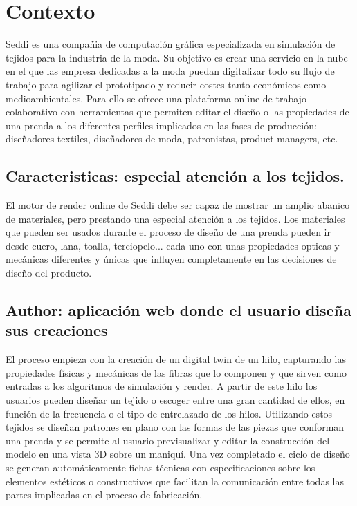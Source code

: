 \chapter{Contexto}
    Seddi es una compañia de computación gr\'afica especializada en simulaci\'on de tejidos para la
    industria de la moda.
    Su objetivo es crear una servicio en la nube en el que las empresa dedicadas a la moda puedan
    digitalizar todo su flujo de trabajo para agilizar el prototipado y reducir costes tanto econ\'omicos
    como medioambientales. Para ello se ofrece una plataforma online de trabajo colaborativo con
    herramientas que permiten editar el dise\~no o las propiedades de una prenda a los diferentes
    perfiles implicados en las fases de producci\'on: diseñadores textiles, diseñadores de moda,
    patronistas, product managers, etc.

\section{Caracteristicas: especial atenci\'on a los tejidos.}
    El motor de render online de Seddi debe ser capaz de mostrar un amplio abanico de materiales,
    pero prestando una especial atenci\'on a los tejidos. Los materiales que pueden ser usados durante
    el proceso de dise\~no de una prenda pueden ir desde cuero, lana, toalla, terciopelo... cada uno
    con unas propiedades opticas y mec\'anicas diferentes y \'unicas que influyen completamente en las
    decisiones de dise\~no del producto.

\section{Author: aplicaci\'on web donde el usuario dise\~na sus creaciones}
    El proceso empieza con la creaci\'on de un digital twin de un hilo, capturando las propiedades
    f\'isicas y mec\'anicas de las fibras que lo componen y que sirven como entradas a los algoritmos de
    simulaci\'on y render. A partir de este hilo los usuarios pueden dise\~nar un tejido o escoger entre
    una gran cantidad de ellos, en funci\'on de la frecuencia o el tipo de entrelazado de los hilos.
    Utilizando estos tejidos se dise\~nan patrones en plano con las formas de las piezas que conforman
    una prenda y se permite al usuario previsualizar y editar la construcci\'on del modelo en una vista
    3D sobre un maniqu\'i. Una vez completado el ciclo de diseño se generan autom\'aticamente fichas técnicas
    con especificaciones sobre los elementos est\'eticos o constructivos que facilitan la comunicaci\'on
    entre todas las partes implicadas en el proceso de fabricaci\'on.